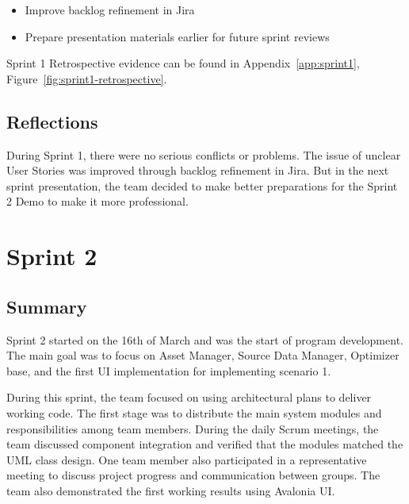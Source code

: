 \begin{itemize}
    \item Improve backlog refinement in Jira

    \item Prepare presentation materials earlier for future sprint reviews

\end{itemize}

Sprint 1 Retrospective evidence can be found in Appendix~\ref{app:sprint1}, Figure~\ref{fig:sprint1-retrospective}.

\subsection*{Reflections}

During Sprint 1, there were no serious conflicts or problems. The issue of unclear User Stories was improved through backlog refinement in Jira. But in the next sprint presentation, the team decided to make better preparations for the Sprint 2 Demo to make it more professional.

 


\section{Sprint 2}

 

\subsection*{Summary}

Sprint 2 started on the 16th of March and was the start of program development. The main goal was to focus on Asset Manager, Source Data Manager, Optimizer base, and the first UI implementation for implementing scenario 1.

During this sprint, the team focused on using architectural plans to deliver working code. The first stage was to distribute the main system modules and responsibilities among team members. During the daily Scrum meetings, the team discussed component integration and verified that the modules matched the UML class design. One team member also participated in a representative meeting to discuss project progress and communication between groups. The team also demonstrated the first working results using Avalonia UI.

 

